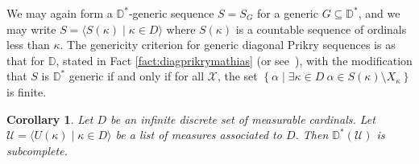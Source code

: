 \documentclass{amsart}
\newtheorem{corollary}[theorem]{Corollary}
\theoremstyle{definition}
\theoremstyle{remark}
\newcommand{\D}{\mathbb{D}}
\newcommand{\U}{\mathcal{U}}
\newcommand{\st}{\; | \;}
\newcommand{\set}[2]{\left\{#1\st #2 \right\}}
\newcommand{\seq}[2]{\langle #1 \st #2 \rangle}
\begin{document}
We may again form a $\D^*$-generic sequence $S = S_G$ for a generic $G \subseteq \D^*$, and we may write $S = \seq{ S(\kappa) }{ \kappa \in D }$ where $S(\kappa)$ is a countable sequence of ordinals less than $\kappa$. The genericity criterion for generic diagonal Prikry sequences is as that for $\D$, stated in Fact \ref{fact:diagprikrymathias} (or see~\cite[Theorem 1]{Fuchs:2005kx}), with the modification that $S$ is $\D^*$ generic if and only if for all $\mathcal X$, the set $\set{ \alpha }{ \exists \kappa \in D \ \alpha \in S(\kappa) \setminus X_\kappa }$ is finite.

\begin{corollary} 
Let $D$ be an infinite discrete set of measurable cardinals. Let $\U = \seq{ U(\kappa) }{ \kappa \in D }$ be a list of measures associated to $D$. Then $\D^*(\U)$ is subcomplete.
\end{corollary}
\end{document}
